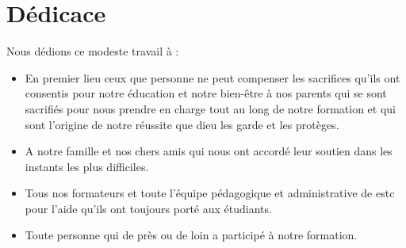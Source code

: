 \chapter*{Dédicace}

Nous dédions ce modeste travail à : \\
\begin{itemize}
    \item En premier lieu ceux que personne ne peut compenser les sacrifices qu’ils ont consentis pour notre éducation et notre bien-être à nos parents qui se sont sacrifiés pour nous prendre en charge tout au long de notre formation et qui sont l’origine de notre réussite que dieu les garde et les protèges.
    \item A notre famille et nos chers amis qui nous ont accordé leur soutien dans les instants les plus difficiles.
    \item Tous nos formateurs et toute l’équipe pédagogique et administrative de \acrshort{estc} pour l’aide qu’ils ont toujours porté aux étudiants.
    \item Toute personne qui de près ou de loin a participé à notre formation.
\end{itemize}